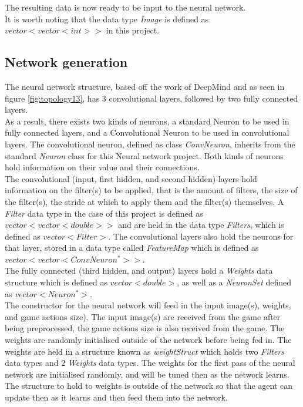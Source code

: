 \documentclass[10pt]{article}
\begin{document}
	The resulting data is now ready to be input to the neural network.\\
	
	It is worth noting that the data type \textit{Image} is defined as $vector<vector<int>>$ in this project.
	\medskip
	
	\subsection{Network generation}
	
	The neural network structure, based off the work of DeepMind and as seen in figure \ref{fig:topology13}, has 3 convolutional layers, followed by two fully connected layers.\\ 
	
	As a result, there exists two kinds of neurons, a standard Neuron to be used in fully connected layers, and a Convolutional Neuron to be used in convolutional layers. The convolutional neuron, defined as class \textit{ConvNeuron}, inherits from the standard \textit{Neuron} class for this Neural network project. Both kinds of neurons hold information on their value and their connections.\\
	
	The convolutional (input, first hidden, and second hidden) layers hold information on the filter(s) to be applied, that is the amount of filters, the size of the filter(s), the stride at which to apply them and the filter(s) themselves. A \textit{Filter} data type in the case of this project is defined as $vector<vector<double>>$ and are held in the data type \textit{Filters}, which is defined as $vector<Filter>$. The convolutional layers also hold the neurons for that layer, stored in a data type called \textit{FeatureMap} which is defined as $vector<vector<ConvNeuron^*>>$.\\
	
	The fully connected (third hidden, and output) layers hold a \textit{Weights} data structure which is defined as $vector<double>$, as well as a \textit{NeuronSet} defined as $vector<Neuron^*>$.\\
	
	The constructor for the neural network will feed in the input image(s), weights, and game actions size). The input image(s) are received from the game after being preprocessed, the game actions size is also received from the game. The weights are randomly initialised outside of the network before being fed in. The weights are held in a structure known as \textit{weightStruct} which holds two \textit{Filters} data types and 2 \textit{Weights} data types. The weights for the first pass of the neural network are initialised randomly, and will be tuned then as the network learns. The structure to hold to weights is outside of the network so that the agent can update then as it learns and then feed them into the network.\\
	
\end{document}
